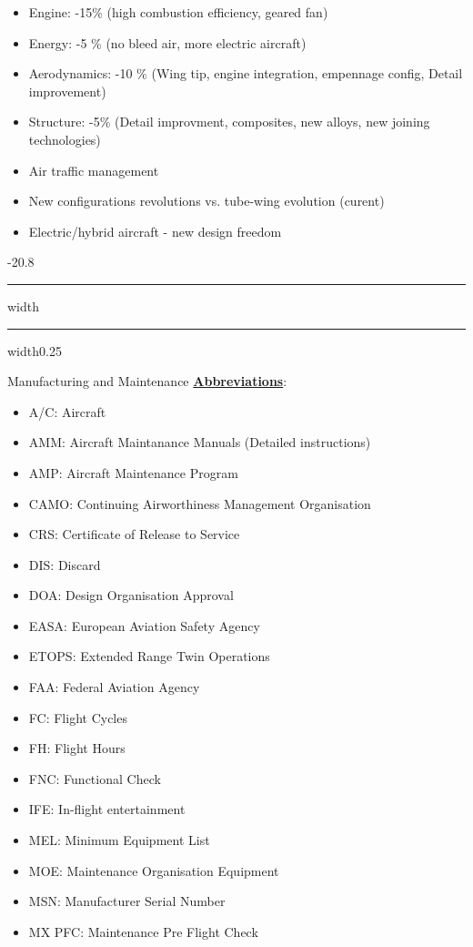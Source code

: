 \documentclass[9pt, landscape, fleqn]{scrartcl}
\makeatletter
\renewcommand{\section}{\@startsection{section}{1}{0mm}%
{-2\baselineskip}{0.8\baselineskip}%
{\hrule depth 0.2pt width\columnwidth\hrule depth1.5pt
width0.25\columnwidth\vspace*{1.2em}\Large\bfseries\rmfamily}}
\makeatother
\begin{document}
\begin{multicols*}{3}
\begin{itemize}
    \item Engine: -15\% (high combustion efficiency, geared fan)
    \item Energy: -5 \% (no bleed air, more electric aircraft)
    \item Aerodynamics: -10 \% (Wing tip, engine integration, empennage config, Detail improvement)
    \item Structure: -5\% (Detail improvment, composites, new alloys, new joining technologies)
    \item Air traffic management
    \item New configurations revolutions vs. tube-wing evolution (curent)
    \item Electric/hybrid aircraft - new design freedom
\end{itemize}
\newpage
\section{Manufacturing and Maintenance}
\underline{\textbf{Abbreviations}}:
\begin{itemize}
    \item A/C: Aircraft
    \item AMM: Aircraft Maintanance Manuals (Detailed instructions)
    \item AMP: Aircraft Maintenance Program
    \item CAMO: Continuing Airworthiness Management Organisation
    \item CRS: Certificate of Release to Service
    \item DIS: Discard
    \item DOA: Design Organisation Approval
    \item EASA: European Aviation Safety Agency
    \item ETOPS: Extended Range Twin Operations
    \item FAA: Federal Aviation Agency
    \item FC: Flight Cycles
    \item FH: Flight Hours
    \item FNC: Functional Check 
    \item IFE: In-flight entertainment
    \item MEL: Minimum Equipment List 
    \item MOE: Maintenance Organisation Equipment
    \item MSN: Manufacturer Serial Number 
    \item MX PFC: Maintenance Pre Flight Check

\end{itemize}
\end{multicols*}
\end{document}
